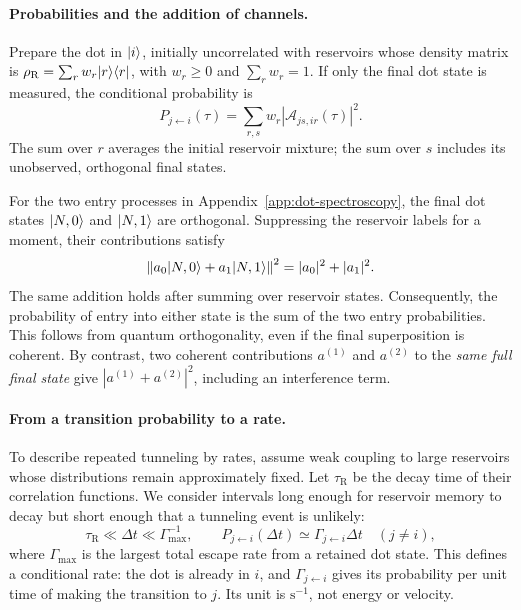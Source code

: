 \paragraph{Probabilities and the addition of channels.}
Prepare the dot in $\lvert i\rangle$, initially uncorrelated with reservoirs
whose density matrix is
$\rho_{\mathrm R}=\sum_r w_r\lvert r\rangle\langle r\rvert$, with
$w_r\geq0$ and $\sum_r w_r=1$. If only the final dot state is
measured, the conditional probability is
\begin{equation}
 P_{j\leftarrow i}(\tau)
   =\sum_{r,s}w_r\left|\mathcal A_{js,ir}(\tau)\right|^2.
 \label{eq:rates-conditional-probability}
\end{equation}
The sum over $r$ averages the initial reservoir mixture; the sum
over $s$ includes its unobserved, orthogonal final states.

For the two entry processes in
Appendix~\ref{app:dot-spectroscopy}, the final dot states
$\lvert N,0\rangle$ and $\lvert N,1\rangle$ are orthogonal. Suppressing the reservoir
labels for a moment, their contributions satisfy
\begin{equation}
 \left\|a_0\ket{N,0}+a_1\ket{N,1}\right\|^2
       =|a_0|^2+|a_1|^2.
 \label{eq:rates-orthogonal-channels}
\end{equation}
The same addition holds after summing over reservoir states.
Consequently, the probability of entry into either state is the
sum of the two entry probabilities. This follows from quantum
orthogonality, even if the final superposition is coherent.
By contrast, two coherent contributions $a^{(1)}$ and $a^{(2)}$
to the \emph{same full final state} give
$|a^{(1)}+a^{(2)}|^2$, including an interference term.

\paragraph{From a transition probability to a rate.}
To describe repeated tunneling by rates, assume weak coupling
to large reservoirs whose distributions remain approximately
fixed. Let $\tau_{\mathrm R}$ be the decay time of their correlation
functions. We consider intervals long enough for reservoir memory
to decay but short enough that a tunneling event is unlikely:
\begin{equation}
 \tau_{\mathrm R}\ll\Delta t\ll\Gamma_{\max}^{-1},
 \qquad
 P_{j\leftarrow i}(\Delta t)
       \simeq\Gamma_{j\leftarrow i}\Delta t\quad(j\ne i),
 \label{eq:rates-coarse-grained-definition}
\end{equation}
where $\Gamma_{\max}$ is the largest total escape rate from a
retained dot state. This defines a conditional rate: the dot is
already in $i$, and $\Gamma_{j\leftarrow i}$ gives its probability
per unit time of making the transition to $j$. Its unit is
$\mathrm{s}^{-1}$, not energy or velocity.

